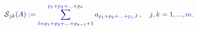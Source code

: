 \documentclass[12pt]{article}
\begin{document}
\makeatletter
\renewcommand*{\@textcolor}[3]{%
  \protect\leavevmode
  \begingroup
    \color#1{#2}#3%
  \endgroup
}
\makeatother
\begin{displaymath}
\mathcal { \mathcolor[RGB]{0,0,15}{S} } _ { \mathcolor[RGB]{0,0,30}{j} \mathcolor[RGB]{0,0,45}{k} } \mathcolor[RGB]{0,0,60}{(} \mathcolor[RGB]{0,0,75}{A} \mathcolor[RGB]{0,0,90}{)} \mathcolor[RGB]{0,0,105}{:} \mathcolor[RGB]{0,0,120}{=} \mathcolor[RGB]{0,0,135}{\sum} _ { \mathcolor[RGB]{0,0,150}{\ell} \mathcolor[RGB]{0,0,165}{=} \mathcolor[RGB]{0,0,180}{p} _ { \mathcolor[RGB]{0,0,195}{1} } \mathcolor[RGB]{0,0,210}{+} \mathcolor[RGB]{0,0,225}{p} _ { \mathcolor[RGB]{0,0,240}{2} } \mathcolor[RGB]{0,0,255}{+} \mathcolor[RGB]{0,15,0}{.} \mathcolor[RGB]{0,15,15}{.} \mathcolor[RGB]{0,15,30}{.} \mathcolor[RGB]{0,15,45}{+} \mathcolor[RGB]{0,15,60}{p} _ { \mathcolor[RGB]{0,15,75}{k} \mathcolor[RGB]{0,15,90}{-} \mathcolor[RGB]{0,15,105}{1} } \mathcolor[RGB]{0,15,120}{+} \mathcolor[RGB]{0,15,135}{1} } ^ { \mathcolor[RGB]{0,15,150}{p} _ { \mathcolor[RGB]{0,15,165}{1} } \mathcolor[RGB]{0,15,180}{+} \mathcolor[RGB]{0,15,195}{p} _ { \mathcolor[RGB]{0,15,210}{2} } \mathcolor[RGB]{0,15,225}{+} \mathcolor[RGB]{0,15,240}{.} \mathcolor[RGB]{0,15,255}{.} \mathcolor[RGB]{0,30,0}{.} \mathcolor[RGB]{0,30,15}{+} \mathcolor[RGB]{0,30,30}{p} _ { \mathcolor[RGB]{0,30,45}{k} } } \mathcolor[RGB]{0,30,60}{a} _ { \mathcolor[RGB]{0,30,75}{p} _ { \mathcolor[RGB]{0,30,90}{1} } \mathcolor[RGB]{0,30,105}{+} \mathcolor[RGB]{0,30,120}{p} _ { \mathcolor[RGB]{0,30,135}{2} } \mathcolor[RGB]{0,30,150}{+} \mathcolor[RGB]{0,30,165}{.} \mathcolor[RGB]{0,30,180}{.} \mathcolor[RGB]{0,30,195}{.} \mathcolor[RGB]{0,30,210}{+} \mathcolor[RGB]{0,30,225}{p} _ { \mathcolor[RGB]{0,30,240}{j} } \mathcolor[RGB]{0,30,255}{,} \mathcolor[RGB]{0,45,0}{\ell} } \, \mathcolor[RGB]{0,45,15}{,} \quad \mathcolor[RGB]{0,45,30}{j} \mathcolor[RGB]{0,45,45}{,} \mathcolor[RGB]{0,45,60}{k} \mathcolor[RGB]{0,45,75}{=} \mathcolor[RGB]{0,45,90}{1} \mathcolor[RGB]{0,45,105}{,} \mathcolor[RGB]{0,45,120}{.} \mathcolor[RGB]{0,45,135}{.} \mathcolor[RGB]{0,45,150}{.} \mathcolor[RGB]{0,45,165}{,} \mathcolor[RGB]{0,45,180}{m} \mathcolor[RGB]{0,45,195}{.}
\end{displaymath}
\end{document}
